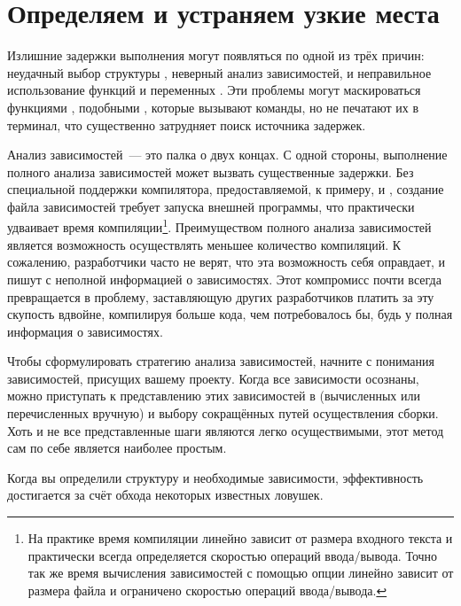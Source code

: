\section{Определяем и устраняем узкие места}
Излишние задержки выполнения  могут появляться по одной
из трёх причин: неудачный выбор структуры , неверный
анализ зависимостей, и неправильное использование функций и переменных
\GNUmake{}. Эти проблемы могут маскироваться функциями \GNUmake{},
подобными , которые вызывают команды, но не печатают
их в терминал, что существенно затрудняет поиск источника задержек.

Анализ зависимостей~--- это палка о двух концах. С одной стороны,
выполнение полного анализа зависимостей может вызвать существенные
задержки. Без специальной поддержки компилятора, предоставляемой, к
примеру,  и , создание файла зависимостей
требует запуска внешней программы, что практически удваивает время
компиляции\footnote{
На практике время компиляции линейно зависит от размера входного
текста и практически всегда определяется скоростью операций
ввода/вывода. Точно так же время вычисления зависимостей с помощью
опции  линейно зависит от размера файла и ограничено
скоростью операций ввода/вывода.}. Преимуществом полного анализа
зависимостей является возможность \GNUmake{} осуществлять меньшее
количество компиляций. К сожалению, разработчики часто не верят, что
эта возможность себя оправдает, и пишут  с неполной
информацией о зависимостях. Этот компромисс почти всегда превращается
в проблему, заставляющую других разработчиков платить за эту скупость
вдвойне, компилируя больше кода, чем потребовалось бы, будь у
\GNUmake{} полная информация о зависимостях.

Чтобы сформулировать стратегию анализа зависимостей, начните с
понимания зависимостей, присущих вашему проекту. Когда все
зависимости осознаны, можно приступать к представлению
этих зависимостей в  (вычисленных или перечисленных
вручную) и выбору сокращённых путей осуществления сборки. Хоть и не
все представленные шаги являются легко осуществимыми, этот метод сам
по себе является наиболее простым.

Когда вы определили структуру  и необходимые зависимости,
эффективность  достигается за счёт обхода некоторых
известных ловушек.


